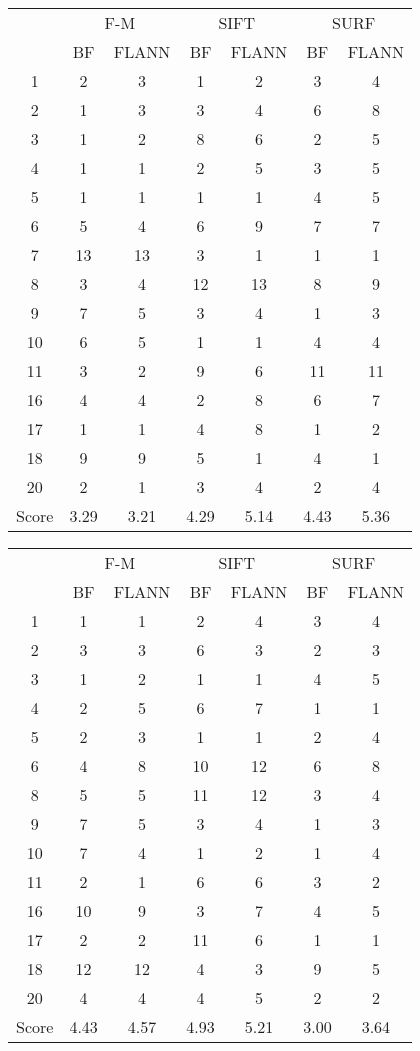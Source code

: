 \documentclass[draft,final]{vutinfth} %
\begin{document}
\begin{appendices}
\begin{minipage}{\linewidth}
\centering
\begin{tabular}{c|cc|cc|cc}
\multirow{2}{*}{ } & \multicolumn{2}{c}{ F-M } & \multicolumn{2}{c}{ SIFT } & \multicolumn{2}{c}{ SURF } \\
& BF & FLANN & BF & FLANN & BF & FLANN \\
\hline
1 & 2 & 3 & 1 & 2 & 3 & 4 \\
2 & 1 & 3 & 3 & 4 & 6 & 8 \\
3 & 1 & 2 & 8 & 6 & 2 & 5 \\
4 & 1 & 1 & 2 & 5 & 3 & 5 \\
5 & 1 & 1 & 1 & 1 & 4 & 5 \\
6 & 5 & 4 & 6 & 9 & 7 & 7 \\
7 & 13 & 13 & 3 & 1 & 1 & 1 \\
8 & 3 & 4 & 12 & 13 & 8 & 9 \\
9 & 7 & 5 & 3 & 4 & 1 & 3 \\
10 & 6 & 5 & 1 & 1 & 4 & 4 \\
11 & 3 & 2 & 9 & 6 & 11 & 11 \\
16 & 4 & 4 & 2 & 8 & 6 & 7 \\
17 & 1 & 1 & 4 & 8 & 1 & 2 \\
18 & 9 & 9 & 5 & 1 & 4 & 1 \\
20 & 2 & 1 & 3 & 4 & 2 & 4 \\
\hline
Score & 3.29 & 3.21 & 4.29 & 5.14 & 4.43 & 5.36 \\
\end{tabular}
 \label{tab:25Cent} 
\end{minipage}

\begin{minipage}{\linewidth}
\centering
\begin{tabular}{c|cc|cc|cc}
\multirow{2}{*}{ } & \multicolumn{2}{c}{ F-M } & \multicolumn{2}{c}{ SIFT } & \multicolumn{2}{c}{ SURF } \\
& BF & FLANN & BF & FLANN & BF & FLANN \\
\hline
1 & 1 & 1 & 2 & 4 & 3 & 4 \\
2 & 3 & 3 & 6 & 3 & 2 & 3 \\
3 & 1 & 2 & 1 & 1 & 4 & 5 \\
4 & 2 & 5 & 6 & 7 & 1 & 1 \\
5 & 2 & 3 & 1 & 1 & 2 & 4 \\
6 & 4 & 8 & 10 & 12 & 6 & 8 \\
8 & 5 & 5 & 11 & 12 & 3 & 4 \\
9 & 7 & 5 & 3 & 4 & 1 & 3 \\
10 & 7 & 4 & 1 & 2 & 1 & 4 \\
11 & 2 & 1 & 6 & 6 & 3 & 2 \\
16 & 10 & 9 & 3 & 7 & 4 & 5 \\
17 & 2 & 2 & 11 & 6 & 1 & 1 \\
18 & 12 & 12 & 4 & 3 & 9 & 5 \\
20 & 4 & 4 & 4 & 5 & 2 & 2 \\
\hline
Score & 4.43 & 4.57 & 4.93 & 5.21 & 3.00 & 3.64 \\
\end{tabular}


\end{minipage}
\end{appendices}
\end{document}
